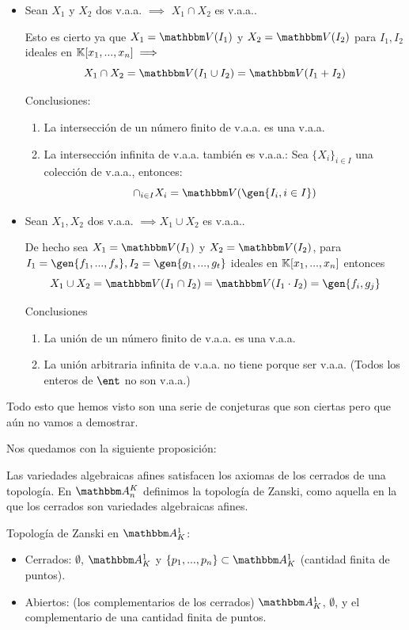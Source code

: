 \begin{itemize}
	\item Sean $X_1$ y $X_2$ dos v.a.a. $\implies$ $X_1 \cap X_2$ es v.a.a..
	
	Esto es cierto ya que $X_1=\V(I_1)$ y $X_2=\V(I_2)$ para $I_1,I_2$ ideales en $\mathbb{K}[x_1,...,x_n] \implies$ 
	$$X_1 \cap X_2 = \V(I_1 \cup I_2)=\V(I_1+I_2)$$
	
	
	Conclusiones:
	\begin{enumerate}
		\item La intersección de un número finito de v.a.a. es una v.a.a.
		\item La intersección infinita de v.a.a. también es v.a.a.: Sea $\{ X_i \}_{i\in I}$ una colección de v.a.a., entonces:
		\[ \cap_{i\in I}X_i = \V(\gen{I_i, i \in I}) \]
	\end{enumerate}
	\item Sean $X_1, X_2$ dos v.a.a. $\implies X_1 \cup X_2$ es v.a.a..
	
	De hecho sea  $X_1=\V(I_1)$ y $X_2=\V(I_2)$,  para $I_1=\gen{f_1,...,f_s},I_2=\gen{g_1,...,g_t}$ ideales en $\mathbb{K}[x_1,...,x_n]$ entonces 
	$$X_1 \cup X_2=\V(I_1 \cap I_2)=\V(I_1 \cdot I_2)=\gen{f_i, g_j}$$
	
	Conclusiones
	\begin{enumerate}
		\item La unión de un número finito de v.a.a. es una v.a.a.
		\item La unión arbitraria infinita de v.a.a. no tiene porque ser v.a.a. (Todos los enteros de $\ent$ no son v.a.a.)
	\end{enumerate}
\end{itemize}

Todo esto que hemos visto son una serie de conjeturas que son ciertas pero que aún no vamos a demostrar.

Nos quedamos con la siguiente proposición: 

\begin{prop}
	Las variedades algebraicas afines satisfacen los axiomas de los cerrados de una topología. En $\Akn$ definimos la topología de Zanski, como aquella en la que los cerrados son variedades algebraicas afines.
\end{prop} 

\begin{example}
	Topología de Zanski en $\A^1_K$:
	\begin{itemize}
		\item Cerrados: $\emptyset$, $\A^1_K$ y $\{ p_1,...,p_n \} \subset \A^1_K$ (cantidad finita de puntos).
		\item Abiertos: (los complementarios de los cerrados) $\A^1_K$, $\emptyset$, y el complementario de una cantidad finita de puntos.
	\end{itemize}
\end{example}



